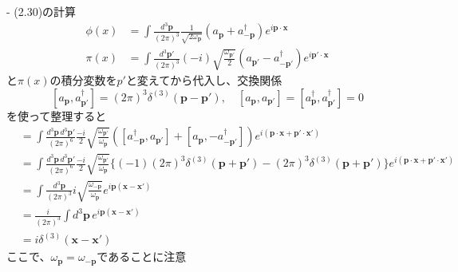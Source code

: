 \documentclass[a4paper]{ltjsarticle}
\begin{document}
- (2.30)の計算
\begin{align*}
  \phi(x) & = \int \frac{d^3\bm{p}}{(2\pi)^3} \frac{1}{\sqrt{2\omega_{\bm{p}}}} ( a_{\bm{p}} + a_{-\bm{p}}^\dagger ) e^{i \bm{p} \cdot \bm{x}} \\
  \pi(x)  & = \int \frac{d^3\bm{p}'}{(2\pi)^3} (-i) \sqrt{\frac{\omega_{\bm{p}'}}{2}} ( a_{\bm{p}'} - a_{-\bm{p}'}^\dagger )e^{i \bm{p}' \cdot \bm{x}}
\end{align*}
と$\pi(x)$の積分変数を$p'$と変えてから代入し、交換関係
\[
  [a_{\bm{p}}, a^\dagger_{\bm{p}'}] = (2\pi)^3 \delta^{(3)}(\bm{p} - \bm{p}'), \quad [a_{\bm{p}}, a_{\bm{p}'}] = [a^\dagger_{\bm{p}}, a^\dagger_{\bm{p}'}] = 0
\]
を使って整理すると
\begin{align*}
  [\phi(x), \pi(x')]
   & = \int \frac{d^3\bm{p} \, d^3\bm{p}'}{(2\pi)^6} \frac{-i}{2} \sqrt{\frac{\omega_{\bm{p}'}}{\omega_{\bm{p}}}} ([a^\dagger_{-\bm{p}}, a_{\bm{p}'}] + [a_{\bm{p}}, -a^\dagger_{-\bm{p}'}]) e^{i(\bm{p} \cdot \bm{x} + \bm{p}' \cdot \bm{x}')} \\
   & = \int \frac{d^3\bm{p} \, d^3\bm{p}'}{(2\pi)^6} \frac{-i}{2} \sqrt{\frac{\omega_{\bm{p}'}}{\omega_{\bm{p}}}} \{ (-1)(2\pi)^3 \delta^{(3)}(\bm{p} + \bm{p}') - (2\pi)^3 \delta^{(3)}(\bm{p} + \bm{p}') \} e^{i(\bm{p} \cdot \bm{x} + \bm{p}' \cdot \bm{x}')} \\
   & = \int \frac{d^3\bm{p}}{(2\pi)^3} i \sqrt{\frac{\omega_{-\bm{p}}}{\omega_{\bm{p}}}} e^{i \bm{p}(\bm{x} - \bm{x}')} \\
   & = \frac{i}{(2\pi)^3} \int d^3\bm{p} \, e^{i \bm{p}(\bm{x} - \bm{x}')} \\
   & = i \delta^{(3)}(\bm{x} - \bm{x}')
\end{align*}
ここで、$\omega_{\bm{p}} = \omega_{-\bm{p}}$であることに注意
\end{document}
